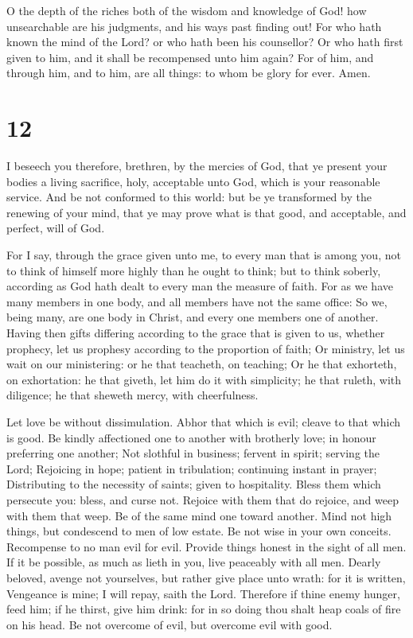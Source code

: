 O the depth of the riches both of the wisdom and knowledge
of God! how unsearchable are his judgments, and his ways past finding
out!  For who hath known the mind of the Lord? or who hath
been his counsellor?  Or who hath first given to him, and
it shall be recompensed unto him again?  For of him, and
through him, and to him, are all things: to whom be glory for ever.
Amen.

\hypertarget{section-11}{%
\section{12}\label{section-11}}

 I beseech you therefore, brethren, by the mercies of God,
that ye present your bodies a living sacrifice, holy, acceptable unto
God, which is your reasonable service.  And be not conformed
to this world: but be ye transformed by the renewing of your mind, that
ye may prove what is that good, and acceptable, and perfect, will of
God.

 For I say, through the grace given unto me, to every man
that is among you, not to think of himself more highly than he ought to
think; but to think soberly, according as God hath dealt to every man
the measure of faith.  For as we have many members in one
body, and all members have not the same office:  So we,
being many, are one body in Christ, and every one members one of
another.  Having then gifts differing according to the grace
that is given to us, whether prophecy, let us prophesy according to the
proportion of faith;  Or ministry, let us wait on our
ministering: or he that teacheth, on teaching;  Or he that
exhorteth, on exhortation: he that giveth, let him do it with
simplicity; he that ruleth, with diligence; he that sheweth mercy, with
cheerfulness.

 Let love be without dissimulation. Abhor that which is
evil; cleave to that which is good.  Be kindly affectioned
one to another with brotherly love; in honour preferring one another;
 Not slothful in business; fervent in spirit; serving the
Lord;  Rejoicing in hope; patient in tribulation;
continuing instant in prayer;  Distributing to the
necessity of saints; given to hospitality.  Bless them
which persecute you: bless, and curse not.  Rejoice with
them that do rejoice, and weep with them that weep.  Be of
the same mind one toward another. Mind not high things, but condescend
to men of low estate. Be not wise in your own conceits. 
Recompense to no man evil for evil. Provide things honest in the sight
of all men.  If it be possible, as much as lieth in you,
live peaceably with all men.  Dearly beloved, avenge not
yourselves, but rather give place unto wrath: for it is written,
Vengeance is mine; I will repay, saith the Lord.  Therefore
if thine enemy hunger, feed him; if he thirst, give him drink: for in so
doing thou shalt heap coals of fire on his head.  Be not
overcome of evil, but overcome evil with good.

